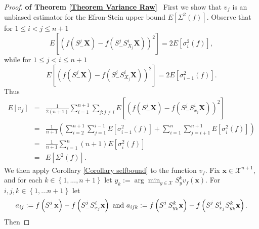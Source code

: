 \documentclass[final,12pt]{colt2018} %
\begin{document}
						\begin{proof}{\bf of Theorem \protect\ref{Theorem Variance Raw}}~
							First we show that $v_{f}$ is an unbiased estimator for the Efron-Stein
							upper bound $E\left[ \Sigma ^{2}\left( f\right) \right] $. Observe that for $%
							1\leq i<j\leq n+1$%
							\begin{equation*}
							E\left[ \left( f\left( S_{-}^{j}\mathbf{X}\right) -f\left(
							S_{-}^{j}S_{X_{j}}^{i}\mathbf{X}\right) \right) ^{2}\right] =2E\left[ \sigma
							_{i}^{2}\left( f\right) \right] , 
							\end{equation*}%
							while for $1\leq j<i\leq n+1$%
							\begin{equation*}
							E\left[ \left( f\left( S_{-}^{j}\mathbf{X}\right) -f\left(
							S_{-}^{j}S_{X_{j}}^{i}\mathbf{X}\right) \right) ^{2}\right] =2E\left[ \sigma
							_{i-1}^{2}\left( f\right) \right] . 
							\end{equation*}%
							Thus%
							\begin{eqnarray*}
								E\left[ v_{f}\right] &=&\frac{1}{2\left( n+1\right) }\sum_{i=1}^{n+1}%
								\sum_{j:j\neq i}E\left[ \left( f\left( S_{-}^{j}\mathbf{X}\right) -f\left(
								S_{-}^{j}S_{x_{j}}^{i}\mathbf{X}\right) \right) ^{2}\right] \\
								&=&\frac{1}{n+1}\left( \sum_{i=2}^{n+1}\sum_{j=1}^{i-1}E\left[ \sigma
								_{i-1}^{2}\left( f\right) \right] +\sum_{i=1}^{n}\sum_{j=i+1}^{n+1}E\left[
								\sigma _{i}^{2}\left( f\right) \right] \right) \\
								&=&\frac{1}{n+1}\sum_{i=1}^{n}\left( n+1\right) E\left[ \sigma
								_{i}^{2}\left( f\right) \right] \\
								&=&E\left[ \Sigma ^{2}\left( f\right) \right] .
							\end{eqnarray*}%
							We then apply Corollary \ref{Corollary selfbound} to the function $v_{f}$.
							Fix $\mathbf{x}\in \mathcal{X}^{n+1}$, and for each $k\in \left\{
							1,...,n+1\right\} $ let $y_{k}:=\arg \min_{y\in \mathcal{X}%
							}S_{y}^{k}v_{f}\left( \mathbf{x}\right) $. For $i,j,k\in \left\{
							1,...n+1\right\} $ let%
							\begin{equation*}
							a_{ij}:=f\left( S_{-}^{j}\mathbf{x}\right) -f\left( S_{-}^{j}S_{x_{j}}^{i}%
							\mathbf{x}\right) \text{ and }a_{ijk}:=f\left( S_{-}^{j}S_{y_{k}}^{k}\mathbf{%
								x}\right) -f\left( S_{-}^{j}S_{x_{j}}^{i}S_{y_{k}}^{k}\mathbf{x}\right) . 
							\end{equation*}%
							Then%

\end{proof}
\end{document}
